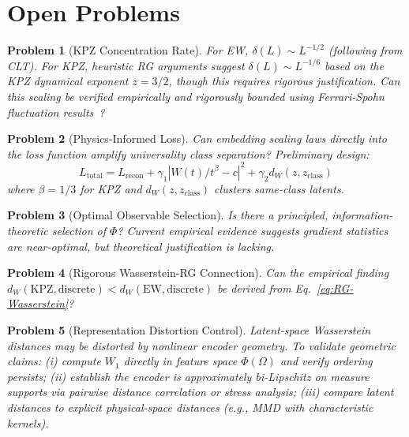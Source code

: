 \documentclass[aps,pre,reprint,amsmath,amssymb,superscriptaddress]{revtex4-2}
\newtheorem{problem}{Problem}
\newcommand{\EW}{\text{EW}}
\newcommand{\KPZ}{\text{KPZ}}
\begin{document}
\section{Open Problems}
\label{sec:open}

\begin{problem}[KPZ Concentration Rate]
For EW, $\delta(L) \sim L^{-1/2}$ (following from CLT). For KPZ, heuristic RG arguments suggest $\delta(L) \sim L^{-1/6}$ based on the KPZ dynamical exponent $z = 3/2$, though this requires rigorous justification. Can this scaling be verified empirically and rigorously bounded using Ferrari-Spohn fluctuation results~\cite{FerrariSpohn2011}?
\end{problem}

\begin{problem}[Physics-Informed Loss]
Can embedding scaling laws directly into the loss function amplify universality class separation? Preliminary design:
\begin{equation}
L_{\text{total}} = L_{\text{recon}} + \gamma_1 |W(t)/t^\beta - c|^2 + \gamma_2 d_W(z, z_{\text{class}})
\end{equation}
where $\beta = 1/3$ for KPZ and $d_W(z, z_{\text{class}})$ clusters same-class latents.
\end{problem}

\begin{problem}[Optimal Observable Selection]
Is there a principled, information-theoretic selection of $\Phi$? Current empirical evidence suggests gradient statistics are near-optimal, but theoretical justification is lacking.
\end{problem}

\begin{problem}[Rigorous Wasserstein-RG Connection]
Can the empirical finding $d_W(\KPZ, \text{discrete}) < d_W(\EW, \text{discrete})$ be derived from Eq.~\eqref{eq:RG-Wasserstein}?
\end{problem}

\begin{problem}[Representation Distortion Control]
Latent-space Wasserstein distances may be distorted by nonlinear encoder geometry. To validate geometric claims: (i) compute $W_1$ directly in feature space $\Phi(\Omega)$ and verify ordering persists; (ii) establish the encoder is approximately bi-Lipschitz on measure supports via pairwise distance correlation or stress analysis; (iii) compare latent distances to explicit physical-space distances (e.g., MMD with characteristic kernels).
\end{problem}
\end{document}
